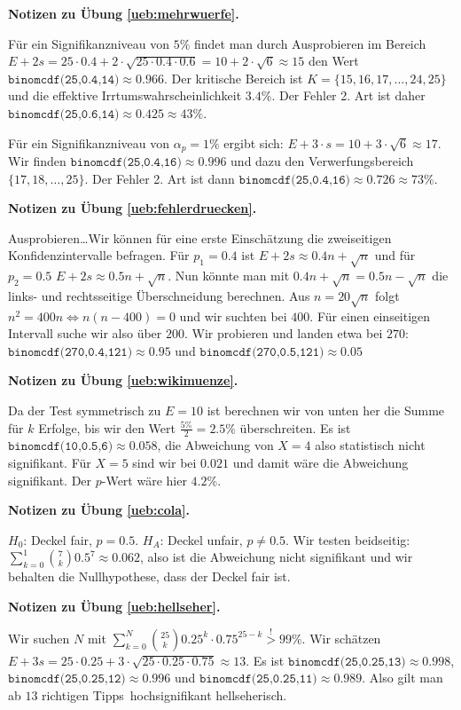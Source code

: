 \documentclass[%
11pt,%
twoside,%
titlepage,%
german,%
headsepline%
]{scrartcl}
\newcommand{\concatueb}[1]{ueb:#1}%
\newcommand{\concatlsg}[1]{lsg:#1}%
\newenvironment{lsg}[1]{%
    \par\noindent\textbf{Notizen zu Übung \ref{\concatueb{#1}}.}%
    \label{\concatlsg{#1}}
}{%
    \par%
}
\begin{document}
\begin{lsg}{mehrwuerfe}
    Für ein Signifikanzniveau von $5\%$ findet man durch Ausprobieren im Bereich $E+2s=25\cdot0.4+2\cdot\sqrt{25\cdot0.4\cdot0.6}=10+2\cdot\sqrt{6}\approx15$ den Wert $\texttt{binomcdf(25,0.4,14)}\approx0.966$. Der kritische Bereich ist $K=\{15,16,17,\dots,24,25\}$ und die effektive Irrtumswahrscheinlichkeit $3.4\%$. Der Fehler 2. Art ist daher\linebreak $\texttt{binomcdf(25,0.6,14)}\approx0.425\approx43\%$.

    Für ein Signifikanzniveau von $\alpha_p=1\%$ ergibt sich: $E+3\cdot s=10+3\cdot\sqrt{6}\approx17$. Wir finden $\texttt{binomcdf(25,0.4,16)}\approx0.996$ und dazu den Verwerfungsbereich $\{17,18,\dots,25\}$. Der Fehler 2. Art ist dann $\texttt{binomcdf(25,0.4,16)}\approx0.726\approx73\%$.
\end{lsg}
\begin{lsg}{fehlerdruecken}
    Ausprobieren\dots Wir können für eine erste Einschätzung die zweiseitigen Konfidenzintervalle befragen. Für $p_1=0.4$ ist $E+2s\approx0.4n+\sqrt{n}$ und für $p_2=0.5$ $E+2s\approx0.5n+\sqrt{n}$. Nun könnte man mit $0.4n+\sqrt{n}=0.5n-\sqrt{n}$ die links- und rechtsseitige Überschneidung berechnen. Aus $n=20\sqrt{n}$ folgt $n^2=400n\Leftrightarrow n(n-400)=0$ und wir suchten bei $400$. Für einen einseitigen Intervall suche wir also über $200$. Wir probieren und landen etwa bei $270$: $\texttt{binomcdf(270,0.4,121)}\approx0.95$ und $\texttt{binomcdf(270,0.5,121)}\approx0.05$
\end{lsg}
\begin{lsg}{wikimuenze}
    Da der Test symmetrisch zu $E=10$ ist berechnen wir von unten her die Summe für $k$ Erfolge, bis wir den Wert $\frac{5\%}{2}=2.5\%$ überschreiten. Es ist $\texttt{binomcdf(10,0.5,6)}\approx0.058$, die Abweichung von $X=4$ also statistisch nicht signifikant. Für $X=5$ sind wir bei $0.021$ und damit wäre die Abweichung signifikant. Der $p$-Wert wäre hier $4.2\%$.
\end{lsg}
\begin{lsg}{cola}
    $H_0$: Deckel fair, $p=0.5$. $H_A$: Deckel unfair, $p\neq0.5$. Wir testen beidseitig: $\sum_{k=0}^1\binom{7}{k}0.5^7\approx0.062$, also ist die Abweichung nicht signifikant und wir behalten die Nullhypothese, dass der Deckel fair ist.
\end{lsg}
\begin{lsg}{hellseher}
    Wir suchen $N$ mit $\sum_{k=0}^N\binom{25}{k}0.25^k\cdot0.75^{25-k}\stackrel{!}{>}99\%$. Wir schätzen $E+3s=25\cdot0.25+3\cdot\sqrt{25\cdot0.25\cdot0.75}\approx13$. Es ist $\texttt{binomcdf(25,0.25,13)}\approx0.998$, $\texttt{binomcdf(25,0.25,12)}\approx0.996$ und $\texttt{binomcdf(25,0.25,11)}\approx0.989$. Also gilt man ab $13$ richtigen \glqq Tipps\grqq\ hochsignifikant hellseherisch.
\end{lsg}
\end{document}
